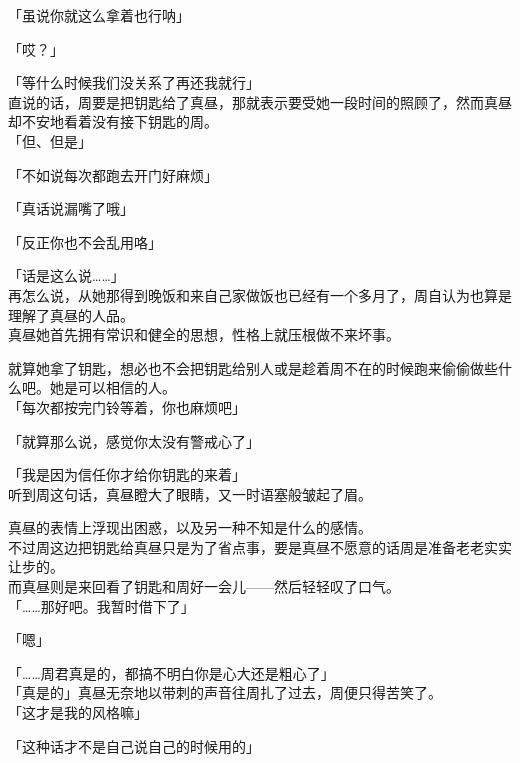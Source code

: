 「虽说你就这么拿着也行呐」

「哎？」

「等什么时候我们没关系了再还我就行」\\

直说的话，周要是把钥匙给了真昼，那就表示要受她一段时间的照顾了，然而真昼却不安地看着没有接下钥匙的周。\\

「但、但是」

「不如说每次都跑去开门好麻烦」

「真话说漏嘴了哦」

「反正你也不会乱用咯」

「话是这么说……」\\

再怎么说，从她那得到晚饭和来自己家做饭也已经有一个多月了，周自认为也算是理解了真昼的人品。\\

真昼她首先拥有常识和健全的思想，性格上就压根做不来坏事。

就算她拿了钥匙，想必也不会把钥匙给别人或是趁着周不在的时候跑来偷偷做些什么吧。她是可以相信的人。\\

「每次都按完门铃等着，你也麻烦吧」

「就算那么说，感觉你太没有警戒心了」

「我是因为信任你才给你钥匙的来着」\\

听到周这句话，真昼瞪大了眼睛，又一时语塞般皱起了眉。

真昼的表情上浮现出困惑，以及另一种不知是什么的感情。\\

不过周这边把钥匙给真昼只是为了省点事，要是真昼不愿意的话周是准备老老实实让步的。\\

而真昼则是来回看了钥匙和周好一会儿——然后轻轻叹了口气。\\

「……那好吧。我暂时借下了」

「嗯」

「……周君真是的，都搞不明白你是心大还是粗心了」\\

「真是的」真昼无奈地以带刺的声音往周扎了过去，周便只得苦笑了。\\

「这才是我的风格嘛」

「这种话才不是自己说自己的时候用的」\\

